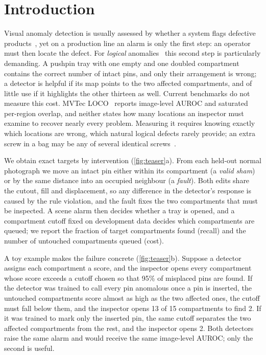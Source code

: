 \documentclass[10pt,twocolumn,letterpaper]{article}
\begin{document}
\section{Introduction}
\label{sec:intro}
Visual anomaly detection is usually assessed by whether a system flags defective products~\cite{bergmann2019mvtec,roth2022patchcore,batzner2024}, yet on a production line an alarm is only the first step: an operator must then locate the defect. For \emph{logical} anomalies~\cite{bergmann2022} this second step is particularly demanding. A pushpin tray with one empty and one doubled compartment contains the correct number of intact pins, and only their arrangement is wrong; a detector is helpful if its map points to the two affected compartments, and of little use if it highlights the other thirteen as well. Current benchmarks do not measure this cost. MVTec LOCO~\cite{bergmann2022} reports image-level AUROC and saturated per-region overlap, and neither states how many locations an inspector must examine to recover nearly every problem. Measuring it requires knowing exactly which locations are wrong, which natural logical defects rarely provide; an extra screw in a bag may be any of several identical screws~\cite{fucka2025}.

We obtain exact targets by intervention (\cref{fig:teaser}a). From each held-out normal photograph we move an intact pin either within its compartment (a \emph{valid sham}) or by the same distance into an occupied neighbour (a \emph{fault}). Both edits share the cutout, fill and displacement, so any difference in the detector's response is caused by the rule violation, and the fault fixes the two compartments that must be inspected. A scene alarm then decides whether a tray is opened, and a compartment cutoff fixed on development data decides which compartments are queued; we report the fraction of target compartments found (recall) and the number of untouched compartments queued (cost).

A toy example makes the failure concrete (\cref{fig:teaser}b). Suppose a detector assigns each compartment a score, and the inspector opens every compartment whose score exceeds a cutoff chosen so that 95\% of misplaced pins are found. If the detector was trained to call every pin anomalous once a pin is inserted, the untouched compartments score almost as high as the two affected ones, the cutoff must fall below them, and the inspector opens 13 of 15 compartments to find 2. If it was trained to mark only the inserted pin, the same cutoff separates the two affected compartments from the rest, and the inspector opens 2. Both detectors raise the same alarm and would receive the same image-level AUROC; only the second is useful.
\end{document}
